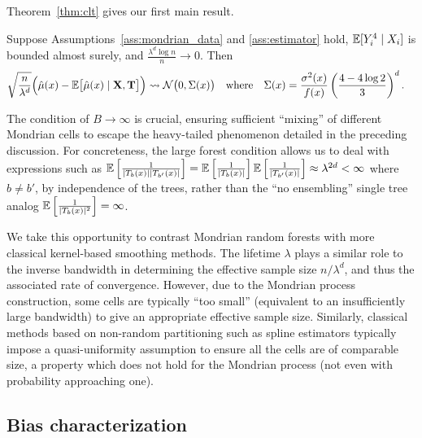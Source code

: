 Theorem~\ref{thm:clt} gives our first main result.

\begin{theorem}%
  \label{thm:clt}
  Suppose Assumptions~\ref{ass:mondrian_data} and \ref{ass:estimator} hold,
  $\mathbb{E}[Y_i^4 \mid X_i ]$ is bounded almost surely,
  and $\frac{\lambda^d \log n}{n} \to 0$. Then
  \begin{align*}
    \sqrt{\frac{n}{\lambda^d}}
    \Big(
      \hat \mu(x)
      - \mathbb{E} \big[ \hat \mu(x) \mid \mathbf{X}, \mathbf{T} \big]
    \Big)
    &\rightsquigarrow
    \mathcal{N}\big(0, \Sigma(x)\big)
    &                &\text{where}
    &\Sigma(x)
    &=
    \frac{\sigma^2(x)}{f(x)}
    \left(
      \frac{4 - 4 \log 2}{3 }
    \right)^d.
  \end{align*}
\end{theorem}

The condition of $B \to \infty$ is crucial,
ensuring sufficient ``mixing'' of different Mondrian cells to escape the
heavy-tailed phenomenon detailed in the preceding discussion.
For concreteness, the large forest condition allows us to deal
with expressions such as
$\mathbb{E} \left[ \frac{1}{|T_b(x)| |T_{b'}(x)|} \right] =
\mathbb{E} \left[ \frac{1}{|T_b(x)|} \right] \mathbb{E} \left[ \frac{1}{|T_{b'}(x)|} \right]
\approx \lambda^{2d} < \infty$
where $b \neq b'$, by independence of the trees, rather than
the ``no ensembling'' single tree analog
$\mathbb{E} \left[ \frac{1}{|T_b(x)|^2} \right] = \infty$.

We take this opportunity to contrast Mondrian random forests with
more classical kernel-based smoothing methods.
The lifetime $\lambda$ plays a similar role to the inverse bandwidth
in determining the effective sample size $n / \lambda^d$, and thus the
associated rate of convergence.
However, due to the Mondrian process
construction, some cells are typically ``too small''
(equivalent to an insufficiently large bandwidth)
to give an appropriate effective sample size.
Similarly, classical methods based on non-random partitioning
such as spline estimators
\citep{huang2003local,cattaneo2020large}
typically impose a quasi-uniformity assumption to ensure
all the cells are of comparable size,
a property which does not hold
for the Mondrian process (not even with probability approaching one).

\subsection*{Bias characterization}

